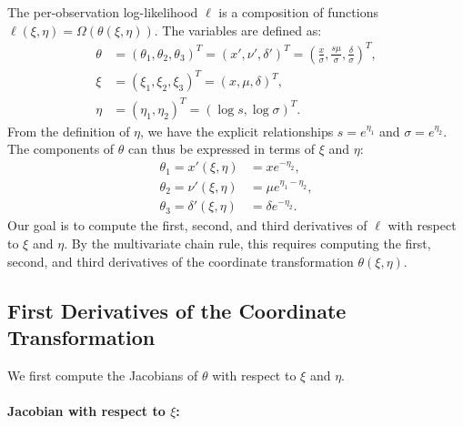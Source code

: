 \documentclass{article}
\begin{document}
The per-observation log-likelihood $\ell$ is a composition of functions $\ell(\xi, \eta) = \Omega(\theta(\xi, \eta))$.
The variables are defined as:
%
\begin{align}
  \theta & = (\theta_1, \theta_2, \theta_3)^T = (x', \nu', \delta')^T = \left(\frac{x}{\sigma}, \frac{s \mu}{\sigma}, \frac{\delta}{\sigma}\right)^T, \\
  \xi    & = (\xi_1, \xi_2, \xi_3)^T = (x, \mu, \delta)^T,                                                                                            \\
  \eta   & = (\eta_1, \eta_2)^T = (\log s, \log \sigma)^T.
\end{align}
%
From the definition of $\eta$, we have the explicit relationships $s = e^{\eta_1}$ and $\sigma = e^{\eta_2}$.
The components of $\theta$ can thus be expressed in terms of $\xi$ and $\eta$:
%
\begin{align}
  \theta_1 = x'(\xi, \eta)      & = x e^{-\eta_2},           \\
  \theta_2 = \nu'(\xi, \eta)    & = \mu e^{\eta_1 - \eta_2}, \\
  \theta_3 = \delta'(\xi, \eta) & = \delta e^{-\eta_2}.
\end{align}
%
Our goal is to compute the first, second, and third derivatives of $\ell$ with respect to $\xi$ and $\eta$.
By the multivariate chain rule, this requires computing the first, second, and third derivatives of the coordinate transformation $\theta(\xi, \eta)$.

\subsection{First Derivatives of the Coordinate Transformation}

We first compute the Jacobians of $\theta$ with respect to $\xi$ and $\eta$.

\paragraph{Jacobian with respect to $\xi$:}
\end{document}
